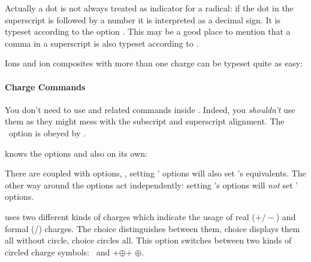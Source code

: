 \documentclass[load-preamble+]{cnltx-doc}
\begin{document}
Actually a dot  is not always treated as
indicator for a radical: if the dot in the superscript is followed by a number
it is interpreted as a decimal sign.  It is typeset according to the option
.  This may be a good place to mention that a comma
\code{,} in a superscript is also typeset according to
.

\begin{example}
  \par
\end{example}

Ions and ion composites with more than one charge can be typeset quite as
easy:
\begin{example}
   
\end{example}

\paragraph{Charge Commands}
You don't need to use  and related commands inside .  Indeed,
you \emph{shouldn't} use them as they might mess with the subscript and
superscript alignment.  The \chemmacros\ option  is obeyed by
.
\begin{example}
\end{example}

\chemformula{} knows the options  and  also
on its own:

There are coupled with \chemmacros{} options, \ie, setting \chemmacros'
options will also set \chemformula's equivalents.  The other way around the
options act independently: setting \chemformula's options will \emph{not} set
\chemmacros' options.
\begin{options}
    \chemformula{} uses two different kinds of charges which indicate the usage
    of real ($+/-$) and formal (\fplus/\fminus) charges.  The choice
     distinguishes between them, choice  displays them
    all without circle, choice  circles all.
    This option switches between two kinds of circled charge symbols:
     \fplus\ and \verbcode+$\oplus$+ $\oplus$.
\end{options}
\end{document}
